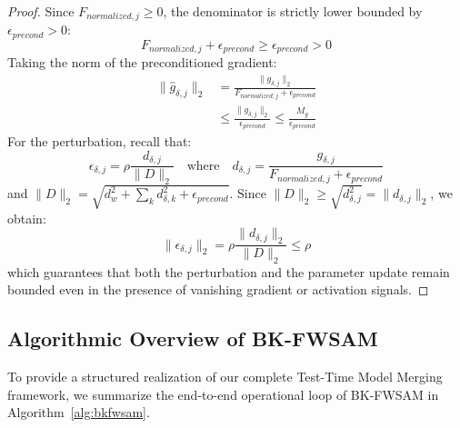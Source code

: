 \documentclass{article}
\theoremstyle{plain}
\theoremstyle{definition}
\theoremstyle{remark}
\begin{document}
\begin{proof}
Since $F_{normalized, j} \geq 0$, the denominator is strictly lower bounded by $\epsilon_{precond} > 0$:
\begin{equation}
  F_{normalized, j} + \epsilon_{precond} \geq \epsilon_{precond} > 0
\end{equation}
Taking the norm of the preconditioned gradient:
\begin{equation}
\begin{split}
  \|\hat{g}_{\delta, j}\|_2 &= \frac{\|g_{\delta, j}\|_2}{F_{normalized, j} + \epsilon_{precond}} \\
  &\leq \frac{\|g_{\delta, j}\|_2}{\epsilon_{precond}} \leq \frac{M_g}{\epsilon_{precond}}
\end{split}
\end{equation}
For the perturbation, recall that:
\begin{equation}
  \epsilon_{\delta, j} = \rho \frac{d_{\delta, j}}{\|D\|_2} \quad \text{where} \quad d_{\delta, j} = \frac{g_{\delta, j}}{F_{normalized, j} + \epsilon_{precond}}
\end{equation}
and $\|D\|_2 = \sqrt{d_w^2 + \sum_k d_{\delta, k}^2 + \epsilon_{precond}}$. Since $\|D\|_2 \geq \sqrt{d_{\delta, j}^2} = \|d_{\delta, j}\|_2$, we obtain:
\begin{equation}
  \|\epsilon_{\delta, j}\|_2 = \rho \frac{\|d_{\delta, j}\|_2}{\|D\|_2} \leq \rho
\end{equation}
which guarantees that both the perturbation and the parameter update remain bounded even in the presence of vanishing gradient or activation signals.
\end{proof}

\subsection{Algorithmic Overview of BK-FWSAM}
To provide a structured realization of our complete Test-Time Model Merging framework, we summarize the end-to-end operational loop of BK-FWSAM in Algorithm~\ref{alg:bkfwsam}.
\end{document}
